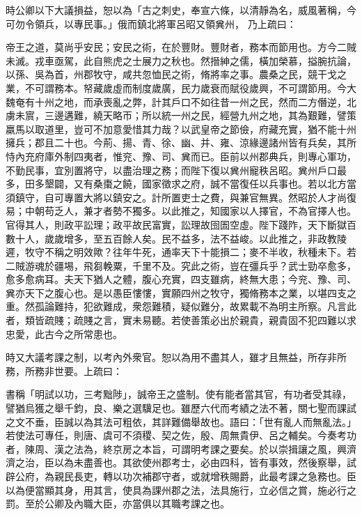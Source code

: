 \begin{pinyinscope}
 
時公卿以下大議損益，恕以為「古之刺史，奉宣六條，以清靜為名，威風著稱，今可勿令領兵，以專民事。」俄而鎮北將軍呂昭又領兾州，
 乃上疏曰：
 
 
 
 
 帝王之道，莫尚乎安民；安民之術，在於豐財。豐財者，務本而節用也。方今二賊未滅。戎車亟駕，此自熊虎之士展力之秋也。然搢紳之儒，橫加榮慕，搤腕抗論，以孫、吳為首，州郡牧守，咸共忽恤民之術，脩將率之事。農桑之民，競干戈之業，不可謂務本。帑藏歲虛而制度歲廣，民力歲衰而賦役歲興，不可謂節用。今大魏奄有十州之地，而承喪亂之弊，計其戶口不如往昔一州之民，然而二方僭逆，北虜未賔，三邊遘難，繞天略帀；所以統一州之民，經營九州之地，其為艱難，譬策羸馬以取道里，豈可不加意愛惜其力哉？以武皇帝之節儉，府藏充實，猶不能十州擁兵；郡且二十也。今荊、揚、青、徐、幽、并、雍、涼緣邊諸州皆有兵矣，其所恃內充府庫外制四夷者，惟兖、豫、司、兾而已。臣前以州郡典兵，則專心軍功，不勤民事，宜別置將守，以盡治理之務；而陛下復以兾州寵秩呂昭。兾州戶口最多，田多墾闢，又有桑棗之饒，國家徵求之府，誠不當復任以兵事也。若以北方當須鎮守，自可專置大將以鎮安之。計所置吏士之費，與兼官無異。然昭於人才尚復易；中朝苟乏人，兼才者勢不獨多。以此推之，知國家以人擇官，不為官擇人也。官得其人，則政平訟理；政平故民富實，訟理故囹圄空虛。陛下踐阼，天下斷獄百數十人，歲歲增多，至五百餘人矣。民不益多，法不益峻。以此推之，非政教陵遲，牧守不稱之明效歟？往年牛死，通率天下十能損二；麥不半收，秋種未下。若二賊游魂於疆埸，飛芻輓粟，千里不及。究此之術，豈在彊兵乎？武士勁卒愈多，愈多愈病耳。夫天下猶人之體，腹心充實，四支雖病，終無大患；今兖、豫、司、兾亦天下之腹心也。是以愚臣慺慺，實願四州之牧守，獨脩務本之業，以堪四支之重。然孤論難持，犯欲難成，衆怨難積，疑似難分，故累載不為明主所察。凡言此者，類皆疏賤；疏賤之言，實未易聽。若使善策必出於親貴，親貴固不犯四難以求忠愛，此古今之所常患也。
 
 
 
 
 時又大議考課之制，以考內外衆官。恕以為用不盡其人，雖才且無益，所存非所務，所務非世要。上疏曰：
 
 
 
 
 書稱「明試以功，三考黜陟」，誠帝王之盛制。使有能者當其官，有功者受其祿，譬猶烏獲之舉千鈞，良、樂之選驥足也。雖歷六代而考績之法不著，關七聖而課試之文不垂，臣誠以為其法可粗依，其詳難備舉故也。語曰：「世有亂人而無亂法。」若使法可專任，則唐、虞可不須稷、契之佐，殷、周無貴伊、呂之輔矣。今奏考功者，陳周、漢之法為，終京房之本旨，可謂明考課之要矣。於以崇揖讓之風，興濟濟之治，臣以為未盡善也。其欲使州郡考士，必由四科，皆有事效，然後察舉，試辟公府，為親民長吏，轉以功次補郡守者，或就增秩賜爵，此最考課之急務也。臣以為便當顯其身，用其言，使具為課州郡之法，法具施行，立必信之賞，施必行之罰。至於公卿及內職大臣，亦當俱以其職考課之也。
 

\end{pinyinscope}
